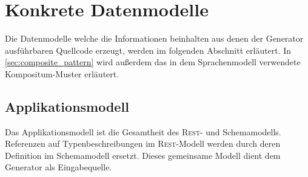 \section{Konkrete Datenmodelle}
\label{sec:concrete_models}

Die Datenmodelle welche die Informationen beinhalten aus denen der Generator ausführbaren Quellcode erzeugt, werden im folgenden Abschnitt erläutert. In \cref{sec:composite_pattern} wird außerdem das in dem Sprachenmodell verwendete Kompositum-Muster erläutert.





\subsection{Applikationsmodell}
\label{sec:application_model}

Das Applikationsmodell ist die Gesamtheit des \textsc{Rest}- und Schemamodells. Referenzen auf Typenbeschreibungen im \textsc{Rest}-Modell werden durch deren Definition im Schemamodell ersetzt. Dieses gemeinsame Modell dient dem Generator als Eingabequelle.

